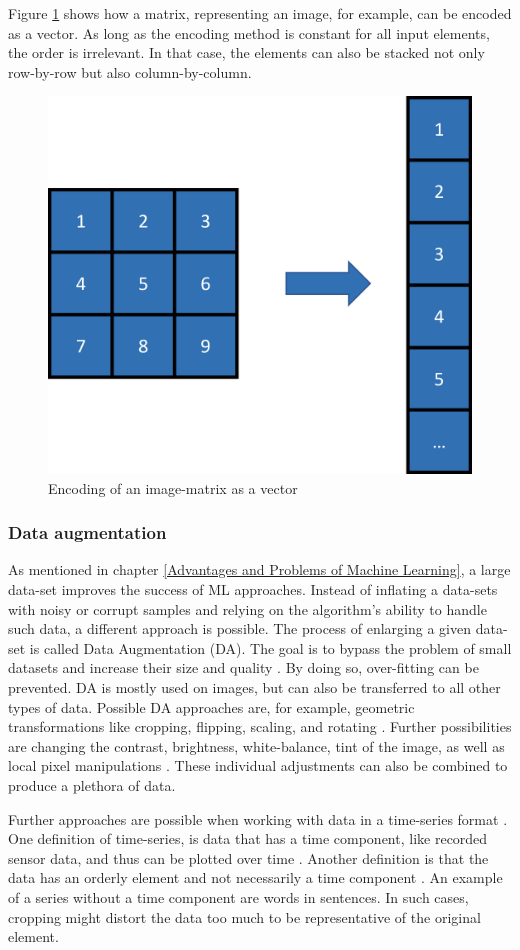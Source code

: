 Figure \ref{fig:encoding} shows how a matrix, representing an image, for example, can be encoded as a vector. As long as the encoding method is constant for all input elements, the order is irrelevant. In that case, the elements can also be stacked not only row-by-row but also column-by-column.

\begin{figure}[H]
	\centering
	\includegraphics[width=0.455\linewidth]{IMGs/encoding.png}
	\caption{Encoding of an image-matrix as a vector}
	\label{fig:encoding}
\end{figure}

 
\subsubsection*{Data augmentation}\label{DAUG}
As mentioned in chapter \ref{Advantages and Problems of Machine Learning}, a large data-set improves the success of ML approaches. Instead of inflating a data-sets with noisy or corrupt samples and relying on the algorithm's ability to handle such data, a different approach is possible. The process of enlarging a given data-set is called Data Augmentation (DA). The goal is to bypass the problem of small datasets and increase their size and quality \cite{Shorten}. By doing so, over-fitting can be prevented. DA is mostly used on images, but can also be transferred to all other types of data. Possible DA approaches are, for example, geometric transformations like cropping, flipping, scaling, and rotating \cite{Taylor}. Further possibilities are changing the contrast, brightness, white-balance, tint of the image, as well as local pixel manipulations \cite{Mikolajczyk}. These individual adjustments can also be combined to produce a plethora of data.

Further approaches are possible when working with data in a time-series format \cite{Bandara, Wen}. One definition of time-series, is data that has a time component, like recorded sensor data, and thus can be plotted over time \cite{Hamilton}. Another definition is that the data has an orderly element and not necessarily a time component \cite{Iwana}. An example of a series without a time component are words in sentences. In such cases, cropping might distort the data too much to be representative of the original element.

